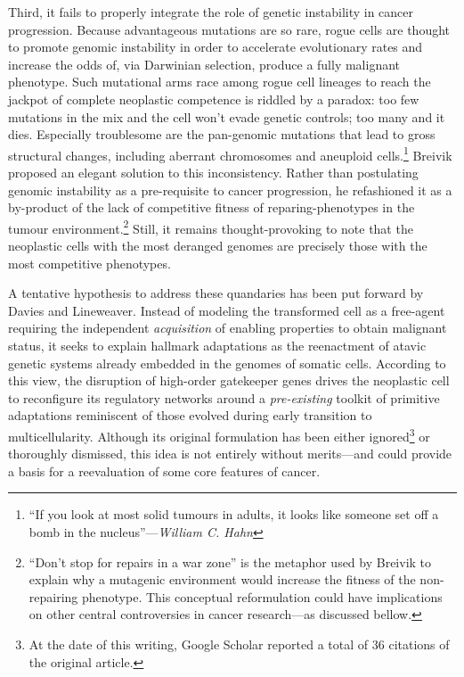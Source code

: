 Third, it fails to properly integrate the role of genetic instability in cancer
progression.  Because advantageous mutations are so rare, rogue cells are
thought to promote genomic instability in order to accelerate evolutionary rates
and increase the odds of, via Darwinian selection, produce a fully malignant
phenotype.\cite{sieber_genomic_2003} Such mutational arms race among rogue cell
lineages to reach the jackpot of complete neoplastic competence is riddled by a
paradox: too few mutations in the mix and the cell won't evade genetic controls;
too many and it dies.  Especially troublesome are the \mbox{pan-genomic}
mutations that lead to gross structural changes, including aberrant chromosomes
and aneuploid cells.\footnote{``If you look at most solid tumours in adults, it
  looks like someone set off a bomb in the nucleus''---\emph{William C. Hahn}}
Breivik proposed an elegant solution to this
inconsistency.\cite{breivik_evolutionary_2005} Rather than postulating genomic
instability as a pre-requisite to cancer progression, he refashioned it as a
\mbox{by-product} of the lack of competitive fitness of reparing-phenotypes in
the tumour environment.\footnote{``Don't stop for repairs in a war zone'' is the
  metaphor used by Breivik to explain why a mutagenic environment would increase
  the fitness of the non-repairing phenotype.  This conceptual reformulation
  could have implications on other central controversies in cancer research---as
  discussed bellow.}  Still, it remains thought-provoking to note that the
neoplastic cells with the most deranged genomes are precisely those with the
most competitive phenotypes.

A tentative hypothesis to address these quandaries has been put forward by
Davies and Lineweaver.\cite{davies_cancer_2011} Instead of modeling the
transformed cell as a free-agent requiring the independent \emph{acquisition} of
enabling properties to obtain malignant status, it seeks to explain hallmark
adaptations as the reenactment of atavic genetic systems already embedded in the
genomes of somatic cells.  According to this view, the disruption of high-order
gatekeeper genes drives the neoplastic cell to reconfigure its regulatory
networks around a \emph{pre-existing} toolkit of primitive adaptations
reminiscent of those evolved during early transition to multicellularity.
Although its original formulation has been either ignored\footnote{At the date
  of this writing, Google Scholar reported a total of 36 citations of the
  original article.} or thoroughly
dismissed,\cite{pettit_cancer_2012,myers_aaargh!_2012} this idea is not entirely
without merits---and could provide a basis for a reevaluation of some core
features of cancer.

